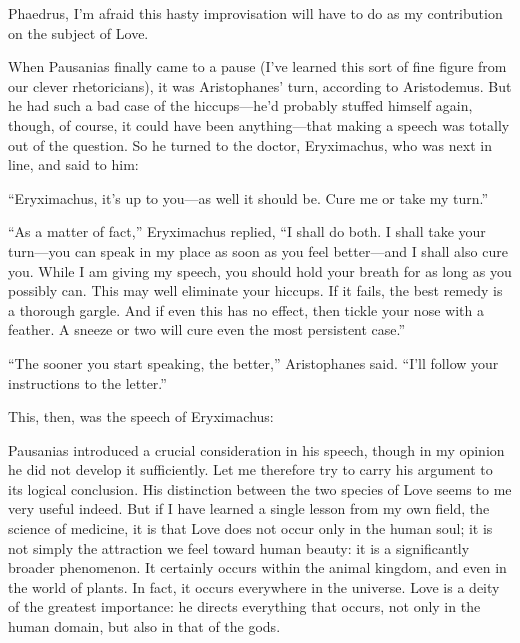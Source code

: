 Phaedrus, I’m afraid this hasty improvisation will have to do as my
contribution on the subject of Love.

When Pausanias finally came to a pause (I’ve learned this sort of fine
figure from our clever rhetoricians), it was Aristophanes’ turn,
according to Aristodemus. But he had such a bad case of the
hiccups---he’d probably stuffed himself again, though, of course, it
could have been anything---that making a speech was totally out of the
question. So he turned to the doctor, Eryximachus, who was next in line,
and said to him: 

“Eryximachus, it’s up to you---as well it should be. Cure me or take my
turn.”

“As a matter of fact,” Eryximachus replied, “I shall do both. I shall
take your turn---you can speak in my place as soon as you feel
better---and I shall also cure you. While I am giving my speech, you
should hold your breath for as long as you possibly can. This may well
eliminate your  hiccups. If it fails, the best remedy is a
thorough gargle. And if even this has no effect, then tickle your nose
with a feather. A sneeze or two will cure even the most persistent
case.”

“The sooner you start speaking, the better,” Aristophanes said. “I’ll
follow your instructions to the letter.”

This, then, was the speech of Eryximachus:

\blank[line]

Pausanias introduced a crucial consideration in his speech, though in my
opinion he did not develop it sufficiently. Let me therefore try to
carry  his argument to its logical conclusion. His
distinction between the two species of Love seems to me very useful
indeed. But if I have learned a single lesson from my own field, the
science of medicine, it is that Love does not occur only in the human
soul; it is not simply the attraction we feel toward human beauty: it is
a significantly broader phenomenon. It  certainly occurs within
the animal kingdom, and even in the world of plants. In fact, it occurs
everywhere in the universe. Love is a deity of the greatest importance:
he directs everything that occurs, not only in the human domain, but
also in that of the gods.

